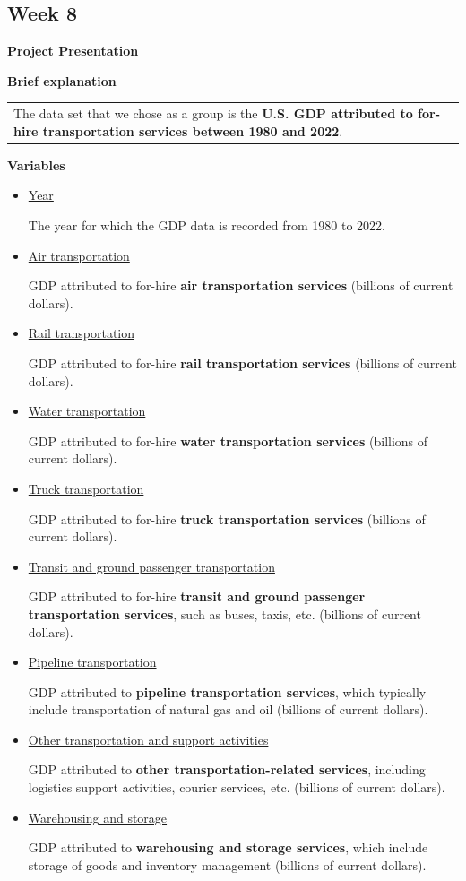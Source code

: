 \documentclass[
  letterpaper,
  DIV=11,
  numbers=noendperiod]{scrreprt}
\begin{document}
\subsection{Week 8}\label{week-8}

\textbf{Project Presentation}

\textbf{Brief explanation}

\begin{longtable}[]{@{}
  >{\raggedright\arraybackslash}p{}@{}}
\toprule\noalign{}
\endhead
\bottomrule\noalign{}
\endlastfoot
The data set that we chose as a group is the \textbf{U.S. GDP attributed
to for-hire transportation services between 1980 and 2022}. \\
\end{longtable}

\textbf{Variables}

\begin{itemize}
\item
  \ul{Year}

  The year for which the GDP data is recorded from 1980 to 2022.
\item
  \ul{Air transportation}

  GDP attributed to for-hire \textbf{air transportation services}
  (billions of current dollars).
\item
  \ul{Rail transportation}

  GDP attributed to for-hire \textbf{rail transportation services}
  (billions of current dollars).
\item
  \ul{Water transportation}

  GDP attributed to for-hire \textbf{water transportation services}
  (billions of current dollars).
\item
  \ul{Truck transportation}

  GDP attributed to for-hire \textbf{truck transportation services}
  (billions of current dollars).
\item
  \ul{Transit and ground passenger transportation}

  GDP attributed to for-hire \textbf{transit and ground passenger
  transportation services}, such as buses, taxis, etc. (billions of
  current dollars).
\item
  \ul{Pipeline transportation}

  GDP attributed to \textbf{pipeline transportation services}, which
  typically include transportation of natural gas and oil (billions of
  current dollars).
\item
  \ul{Other transportation and support activities}

  GDP attributed to \textbf{other transportation-related services},
  including logistics support activities, courier services, etc.
  (billions of current dollars).
\item
  \ul{Warehousing and storage}

  GDP attributed to \textbf{warehousing and storage services}, which
  include storage of goods and inventory management (billions of current
  dollars).\\
\end{itemize}
\end{document}

